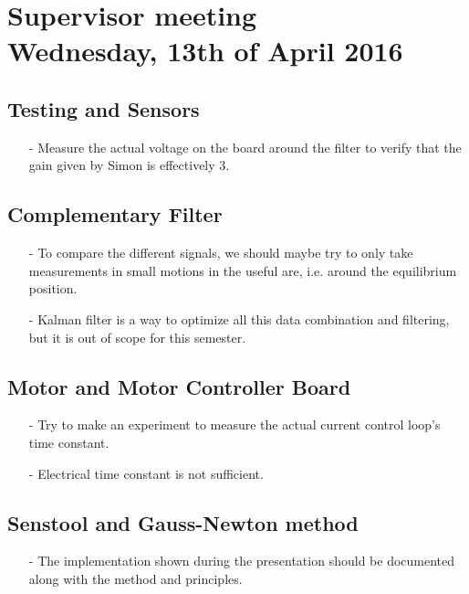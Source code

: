 

\renewcommand\chaptername{KAPITEL}
\renewcommand\contentsname{Indhold}
\renewcommand\figurename{Figur}
\renewcommand\tablename{Tabel}

\section*{Supervisor meeting\\ \small Wednesday, 13th of April 2016}

\subsection{Testing and Sensors}
\begin{itemize}
  \item[-] Measure the actual voltage on the board around the filter to verify that the gain given by Simon is effectively 3.
\end{itemize}

\subsection{Complementary Filter}
\begin{itemize}
  \item[-] To compare the different signals, we should maybe try to only take measurements in small motions in the useful are, i.e. around the equilibrium position.
  \item[-] Kalman filter is a way to optimize all this data combination and filtering, but it is out of scope for this semester.
\end{itemize}

\subsection{Motor and Motor Controller Board}
\begin{itemize}
  \item[-] Try to make an experiment to measure the actual current control loop's time constant.
  \item[-] Electrical time constant is not sufficient.
\end{itemize}

\subsection{Senstool and Gauss-Newton method}
\begin{itemize}
  \item[-] The implementation shown during the presentation should be documented along with the method and principles.
\end{itemize}

